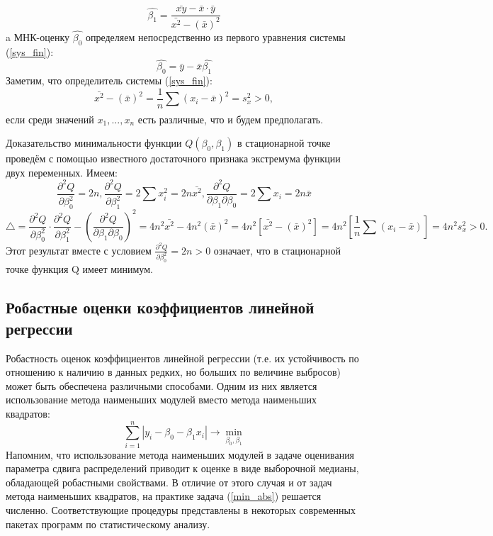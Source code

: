 \documentclass[12pt]{article}
\begin{document}
	\begin{equation}
		\hat{\beta_{1}} = \frac{\bar{xy} - \bar{x} \cdot \bar{y}}{\bar{x^{2}} - (\bar{x})^{2}}
		\label{beta_1_new}
	\end{equation}
	a МНК-оценку $\hat{\beta_0}$  определяем непосредственно из первого уравнения системы (\ref{sys_fin}):
	\begin{equation}
		\hat{\beta_{0}} = \bar{y} - \bar{x}\hat{\beta_{1}}
		\label{beta_0_new}
	\end{equation}
	Заметим, что определитель системы (\ref{sys_fin}):
	\begin{equation}
		\bar{x^{2}} - (\bar{x})^{2} = \frac{1}{n}\sum_{}{}{(x_{i} - \bar{x})^{2}} = s_{x}^{2} > 0, 
	\end{equation}
	если среди значений $x_{1},...,x_{n}$ есть различные, что и будем предполагать.

	Доказательство минимальности функции $Q(\beta_{0}, \beta_{1})$ в стационарной точке проведём с помощью известного достаточного признака экстремума функции двух переменных. Имеем:
	\begin{equation}
		\frac{\partial ^{2} Q}{\partial \beta_{0}^{2}} = 2n, 
		\frac{\partial ^{2} Q}{\partial \beta_{1}^{2}} = 2\sum_{}{}{x_{i}^{2}} = 2n\bar{x^{2}}, 
		\frac{\partial ^{2} Q}{\partial \beta_{1} \partial \beta_{0}} = 2\sum_{}{}{x_{i}} = 2n\bar{x}
		\label{frac_eq}
	\end{equation}
	\begin{equation}
		\bigtriangleup = \frac{\partial^{2}Q}{\partial \beta_{0}^{2}} \cdot \frac{\partial^{2}Q}{\partial \beta_{1}^{2}} - (\frac{\partial^{2}Q}{\partial \beta_{1} \partial \beta_{0}})^{2} = 
		4n^{2}\bar{x^{2}} - 4n^2(\bar{x})^{2} = 
		4n^{2}\left[\bar{x^{2}} - (\bar{x})^{2}\right] = 4n^{2}\left[ \frac{1}{n}\sum{}_{}{(x_{i} - \bar{x})}\right] = 4n^{2}s_{x}^{2} > 0.
		\label{det_sys}
	\end{equation}
	Этот результат вместе с условием $\frac{\partial^{2}Q}{\partial \beta_{0}^{2}} = 2n > 0$ означает, что в стационарной точке функция Q имеет минимум.
	
	\subsection{Робастные оценки коэффициентов линейной регрессии}
	Робастность оценок коэффициентов линейной регрессии (т.е. их устойчивость по отношению к наличию в данных редких, но больших по величине выбросов) может быть обеспечена различными способами. Одним из них является использование метода наименьших модулей вместо метода наименьших квадратов:
	\begin{equation}
		\sum_{i=1}^{n}{|y_{i} - \beta_{0} - \beta_{1}x_{i}|}\rightarrow \min_{\beta_{0}, \beta_{1}}
		\label{min_abs}
	\end{equation}
	Напомним, что использование метода наименьших модулей в задаче оценивания параметра сдвига распределений приводит к оценке в виде выборочной медианы, обладающей робастными свойствами. В отличие от этого случая и от задач метода наименьших квадратов, на практике задача (\ref{min_abs}) решается численно. Соответствующие процедуры представлены в некоторых современных пакетах программ по статистическому анализу.
\end{document}
